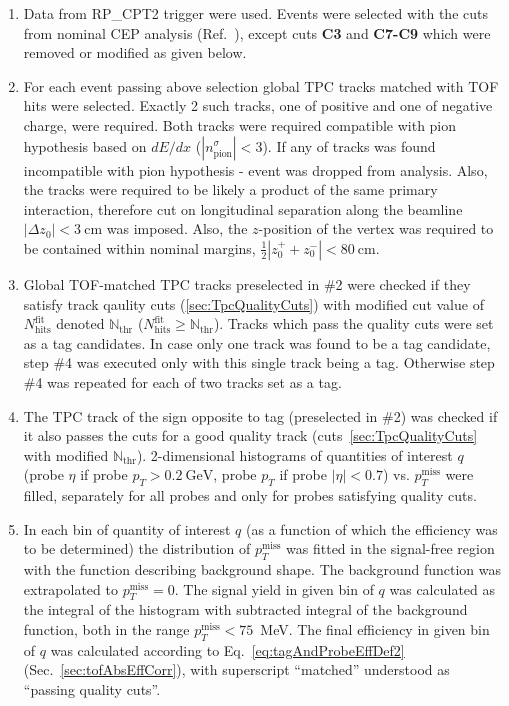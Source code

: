 \begin{enumerate}
 \item Data from RP\_CPT2 trigger were used. Events were selected with the cuts from nominal CEP analysis (Ref.~\cite{AnalysisNoteRafal}), except cuts \textbf{C3} and \textbf{C7-C9} which were removed or modified as given below.\\[-20pt]%
 \item For each event passing above selection global TPC tracks matched with TOF hits were selected. Exactly 2 such tracks, one of positive and one of negative charge, were required. Both tracks were required compatible with pion hypothesis based on $dE/dx$ ($|n^{\sigma}_{\text{pion}}|<3$). If any of tracks was found incompatible with pion hypothesis - event was dropped from analysis. Also, the tracks were required to be likely a product of the same primary interaction, therefore cut on longitudinal separation along the beamline $|\Delta z_{0}| < 3~\text{cm}$ was imposed. Also, the $z$-position of the vertex was required to be contained within nominal margins, $\frac{1}{2}|z_{0}^{+}+z_{0}^{-}| < 80~\text{cm}$.\\[-20pt]%
 \item Global TOF-matched TPC tracks preselected in \#2 were checked if they satisfy track qaulity cuts (\ref{sec:TpcQualityCuts}) with modified cut value of $N_{\text{hits}}^{\text{fit}}$ denoted $\mathbb{N}_{\text{thr}}$ ($N_{\text{hits}}^{\text{fit}} \geq \mathbb{N}_{\text{thr}}$). Tracks which pass the quality cuts were set as a tag candidates. In case only one track was found to be a tag candidate, step \#4 was executed only with this single track being a tag. Otherwise step \#4 was repeated for each of two tracks set as a tag.\\[-20pt]%
 \item The TPC track of the sign opposite to tag (preselected in \#2) was checked if it also passes the cuts for a good quality track (cuts~\ref{sec:TpcQualityCuts} with modified $\mathbb{N}_{\text{thr}}$). 2-dimensional histograms of quantities of interest $q$ (probe $\eta$ if probe $p_{T}>0.2~\text{GeV}$, probe $p_{T}$ if probe $|\eta|<0.7$) vs. $p_{T}^{\text{miss}}$ were filled, separately for all probes and only for probes satisfying quality cuts.\\[-20pt]%
 \item In each bin of quantity of interest $q$ (as a function of which the efficiency was to be determined) the distribution of $p_{T}^{\text{miss}}$ was fitted in the signal-free region with the function describing background shape. The background function was extrapolated to $p_{T}^{\text{miss}}=0$. The signal yield in given bin of $q$ was calculated as the integral of the histogram with subtracted integral of the background function, both in the range $p_{T}^{\text{miss}}<75$~MeV. The final efficiency in given bin of $q$ was calculated according to Eq.~\eqref{eq:tagAndProbeEffDef2} (Sec.~\ref{sec:tofAbsEffCorr}), with superscript ``matched'' understood as ``passing quality cuts''.
\end{enumerate}

